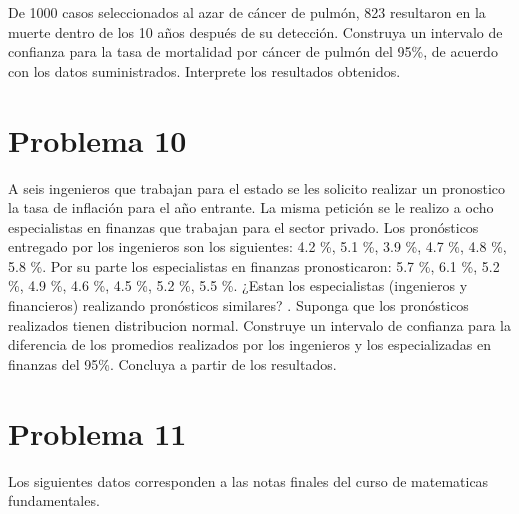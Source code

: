 \documentclass[
]{article}
\begin{document}
De 1000 casos seleccionados al azar de cáncer de pulmón, 823 resultaron
en la muerte dentro de los 10 años después de su detección. Construya un
intervalo de confianza para la tasa de mortalidad por cáncer de pulmón
del 95\%, de acuerdo con los datos suministrados. Interprete los
resultados obtenidos.

\hypertarget{problema-10}{%
\section{\texorpdfstring{\textbf{Problema
10}}{Problema 10}}\label{problema-10}}

A seis ingenieros que trabajan para el estado se les solicito realizar
un pronostico la tasa de inflación para el año entrante. La misma
petición se le realizo a ocho especialistas en finanzas que trabajan
para el sector privado. Los pronósticos entregado por los ingenieros son
los siguientes: 4.2 \%, 5.1 \%, 3.9 \%, 4.7 \%, 4.8 \%, 5.8 \%. Por su
parte los especialistas en finanzas pronosticaron: 5.7 \%, 6.1 \%, 5.2
\%, 4.9 \%, 4.6 \%, 4.5 \%, 5.2 \%, 5.5 \%. ¿Estan los especialistas
(ingenieros y financieros) realizando pronósticos similares? . Suponga
que los pronósticos realizados tienen distribucion normal. Construye un
intervalo de confianza para la diferencia de los promedios realizados
por los ingenieros y los especializadas en finanzas del 95\%. Concluya a
partir de los resultados.

\hypertarget{problema-11}{%
\section{\texorpdfstring{\textbf{Problema
11}}{Problema 11}}\label{problema-11}}

Los siguientes datos corresponden a las notas finales del curso de
matematicas fundamentales.
\end{document}
